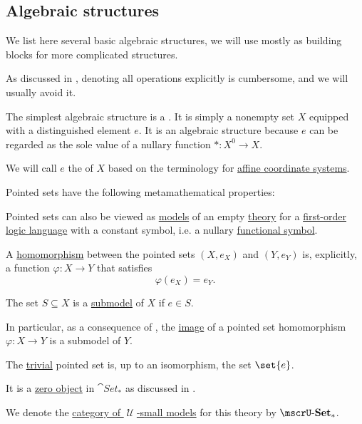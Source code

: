 \subsection{Algebraic structures}\label{subsec:algebraic_structures}

We list here several basic algebraic structures, we will use mostly as building blocks for more complicated structures.

As discussed in , denoting all operations explicitly is cumbersome, and we will usually avoid it.

\begin{definition}\label{def:pointed_set}
  The simplest algebraic structure is a . It is simply a nonempty set \( X \) equipped with a distinguished element \( e \). It is an algebraic structure because \( e \) can be regarded as the sole value of a nullary function \( *: X^0 \to X \).

  We will call \( e \) the  of \( X \) based on the terminology for \hyperref[def:euclidean_plane_coordinate_system/origin]{affine coordinate systems}.

  Pointed sets have the following metamathematical properties:
  \begin{thmenum}
     Pointed sets can also be viewed as \hyperref[def:first_order_semantics/satisfiability]{models} of an empty \hyperref[def:first_order_theory]{theory} for a \hyperref[def:first_order_language]{first-order logic language} with a constant symbol, i.e. a nullary \hyperref[def:first_order_language/func]{functional symbol}.

     A \hyperref[def:first_order_homomorphism]{homomorphism} between the pointed sets \( (X, e_{X}) \) and \( (Y, e_{Y}) \) is, explicitly, a function \( \varphi: X \to Y \) that satisfies
    \begin{equation}\label{eq:def:pointed_set/homomorphism}
      \varphi(e_{X}) = e_{Y}.
    \end{equation}

     The set \( S \subseteq X \) is a \hyperref[thm:substructure_is_model]{submodel} of \( X \) if \( e \in S \).

    In particular, as a consequence of , the \hyperref[def:multi_valued_function/image]{image} of a pointed set homomorphism \( \varphi: X \to Y \) is a submodel of \( Y \).

     The \hyperref[thm:substructures_form_complete_lattice/bottom]{trivial} pointed set is, up to an isomorphism, the set \( \set{ e } \).

    It is a \hyperref[def:universal_objects/initial]{zero object} in \( \cat{Set_*} \) as discussed in .

     We denote the \hyperref[def:category_of_small_first_order_models]{category of \( \mscrU \)-small models} for this theory by \( \ucat{Set}_* \).
  \end{thmenum}
\end{definition}

